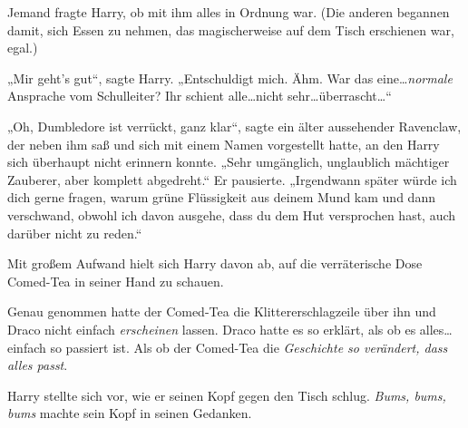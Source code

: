 Jemand fragte Harry, ob mit ihm alles in Ordnung war. (Die anderen begannen damit, sich Essen zu nehmen, das magischerweise auf dem Tisch erschienen war, egal.)

„Mir geht’s gut“, sagte Harry. „Entschuldigt mich. Ähm. War das eine…\emph{normale} Ansprache vom Schulleiter? Ihr schient alle…nicht sehr…überrascht…“

„Oh, Dumbledore ist verrückt, ganz klar“, sagte ein älter aussehender Ravenclaw, der neben ihm saß und sich mit einem Namen vorgestellt hatte, an den Harry sich überhaupt nicht erinnern konnte. „Sehr umgänglich, unglaublich mächtiger Zauberer, aber komplett abgedreht.“ Er pausierte. „Irgendwann später würde ich dich gerne fragen, warum grüne Flüssigkeit aus deinem Mund kam und dann verschwand, obwohl ich davon ausgehe, dass du dem Hut versprochen hast, auch darüber nicht zu reden.“

Mit großem Aufwand hielt sich Harry davon ab, auf die verräterische Dose Comed-Tea in seiner Hand zu schauen.

Genau genommen hatte der Comed-Tea die Klittererschlagzeile über ihn und Draco nicht einfach \emph{erscheinen} lassen. Draco hatte es so erklärt, als ob es alles…einfach so passiert ist. Als ob der Comed-Tea die \emph{Geschichte so verändert, dass alles passt}.

Harry stellte sich vor, wie er seinen Kopf gegen den Tisch schlug. \emph{Bums, bums, bums} machte sein Kopf in seinen Gedanken.

